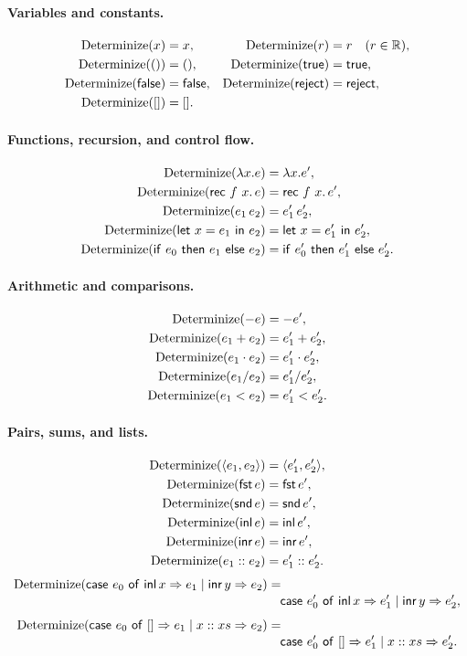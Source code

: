 \paragraph{Variables and constants.}
\begin{align*}
  \trans x &= x,&
  \trans r &= r \quad(r\in\Real),\\
  \trans{()} &= (),&
  \trans{\kw{true}} &= \kw{true},\\
  \trans{\kw{false}} &= \kw{false},&
  \trans{\kw{reject}} &= \kw{reject},\\
  \trans{[]} &= [].
\end{align*}

\paragraph{Functions, recursion, and control flow.}
\begin{align*}
  \trans{\lambda x.e} &= \lambda x.e',\\
  \trans{\recfn f x e} &= \recfn f x{e'},\\
  \trans{e_1\,e_2} &= e_1'\,e_2',\\
  \trans{\letin x{e_1}{e_2}} &= \letin x{e_1'}{e_2'},\\
  \trans{\ite{e_0}{e_1}{e_2}} &= \ite{e_0'}{e_1'}{e_2'}.
\end{align*}

\paragraph{Arithmetic and comparisons.}
\begin{align*}
  \trans{-e} &= -e',\\
  \trans{e_1+e_2} &= e_1'+e_2',\\
  \trans{e_1\cdot e_2} &= e_1'\cdot e_2',\\
  \trans{e_1/e_2} &= e_1'/e_2',\\
  \trans{e_1<e_2} &= e_1'<e_2'.
\end{align*}

\paragraph{Pairs, sums, and lists.}
\begin{align*}
  \trans{\langle e_1,e_2\rangle} &= \langle e_1',e_2'\rangle,\\
  \trans{\kw{fst}\,e} &= \kw{fst}\,e',\\
  \trans{\kw{snd}\,e} &= \kw{snd}\,e',\\
  \trans{\kw{inl}\,e} &= \kw{inl}\,e',\\
  \trans{\kw{inr}\,e} &= \kw{inr}\,e',\\
  \trans{e_1::e_2} &= e_1'::e_2'.
\end{align*}
\begin{align*}
  \trans{\scase{e_0}x{e_1}y{e_2}}
    &={}\\[-2pt]
    &\quad\scase{e_0'}x{e_1'}y{e_2'},\\[4pt]
  \trans{\lcase{e_0}{e_1}x{xs}{e_2}}
    &={}\\[-2pt]
    &\quad\lcase{e_0'}{e_1'}x{xs}{e_2'}.
\end{align*}

